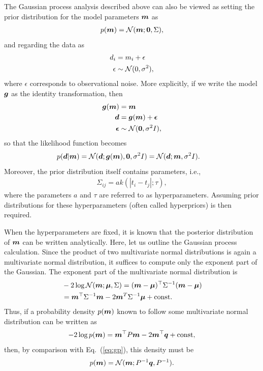 The Gaussian process analysis described above can also be viewed as setting the prior distribution for the model parameters $\boldsymbol{m}$ as
\begin{align}
p(\boldsymbol{m}) = \mathcal{N} (\boldsymbol{m}; \boldsymbol{0},\Sigma),
\end{align}
and regarding the data as
\begin{align}
d_i &= m_i + \epsilon \\
\epsilon &\sim \mathcal{N} (0,\sigma^2),
\end{align}
where $\epsilon$ corresponds to observational noise. More explicitly, if we write the model $\boldsymbol{g}$ as the identity transformation, then
\begin{align}
\label{eq:identif}
\boldsymbol{g}(\boldsymbol{m}) &= \boldsymbol{m} \\
\boldsymbol{d} &= \boldsymbol{g}(\boldsymbol{m}) + \boldsymbol{\epsilon} \\
\boldsymbol{\epsilon} &\sim \mathcal{N} (\boldsymbol{0} ,\sigma^2 I),
\end{align}
so that the likelihood function becomes
\begin{align}
p(\boldsymbol{d}|\boldsymbol{m}) &= \mathcal{N} (\boldsymbol{d} ; \boldsymbol{g}(\boldsymbol{m}),  \boldsymbol{0} ,\sigma^2 I) = \mathcal{N} (\boldsymbol{d} ; \boldsymbol{m},\sigma^2 I).
\end{align}
Moreover, the prior distribution itself contains parameters, i.e.,
\begin{align}
\Sigma_{ij} = a k(|t_i-t_j|;\tau),
\end{align}
where the parameters $a$ and $\tau$ are referred to as hyperparameters. Assuming prior distributions for these hyperparameters (often called hyperpriors) is then required.

When the hyperparameters are fixed, it is known that the posterior distribution of $\boldsymbol{m}$ can be written analytically. Here, let us outline the Gaussian process calculation. Since the product of two multivariate normal distributions is again a multivariate normal distribution, it suffices to compute only the exponent part of the Gaussian. The exponent part of the multivariate normal distribution is
\begin{align}
\label{eq:gp}
&- 2 \log{ \mathcal{N}(\boldsymbol{m}; \boldsymbol{\mu}, \Sigma) } = (\boldsymbol{m} - \boldsymbol{\mu})^\top \Sigma^{-1} (\boldsymbol{m} - \boldsymbol{\mu}) \nonumber \\
&= \boldsymbol{m}^\top \Sigma^{-1} \boldsymbol{m} - 2 \boldsymbol{m}^T \Sigma^{-1} \boldsymbol{\mu} + \mathrm{const}.
\end{align}
Thus, if a probability density $p(\boldsymbol{m})$ known to follow some multivariate normal distribution can be written as
\begin{align}
\label{eq:gpqu}
- 2 \log{ p(\boldsymbol{m}) } = \boldsymbol{m}^\top P \boldsymbol{m} - 2 \boldsymbol{m}^\top \boldsymbol{q} + \mathrm{const},
\end{align}
then, by comparison with Eq.~(\ref{eq:gp}), this density must be
\begin{align}
\label{eq:gpqusol}
p(\boldsymbol{m}) = \mathcal{N}(\boldsymbol{m}; P^{-1} \boldsymbol{q} ,P^{-1}).
\end{align}


